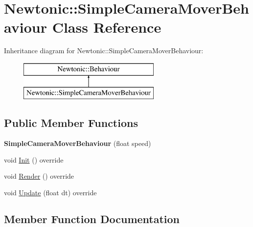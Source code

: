 \hypertarget{classNewtonic_1_1SimpleCameraMoverBehaviour}{}\section{Newtonic\+::Simple\+Camera\+Mover\+Behaviour Class Reference}
\label{classNewtonic_1_1SimpleCameraMoverBehaviour}
Inheritance diagram for Newtonic\+::Simple\+Camera\+Mover\+Behaviour\+:\begin{figure}[H]
\begin{center}
\leavevmode
\includegraphics[height=2.000000cm]{classNewtonic_1_1SimpleCameraMoverBehaviour}
\end{center}
\end{figure}
\subsection*{Public Member Functions}
\begin{DoxyCompactItemize}
\item 
\mbox{\label{classNewtonic_1_1SimpleCameraMoverBehaviour_ae82d69ee38d1ffa5f8dd0252be37f1ee}} 
{\bfseries Simple\+Camera\+Mover\+Behaviour} (float speed)
\item 
void \mbox{\hyperlink{classNewtonic_1_1SimpleCameraMoverBehaviour_ab119794df7ce0e548912caa100b7fcf5}{Init}} () override
\item 
void \mbox{\hyperlink{classNewtonic_1_1SimpleCameraMoverBehaviour_a52037ac47383855fa58f1fbebbb75e44}{Render}} () override
\item 
void \mbox{\hyperlink{classNewtonic_1_1SimpleCameraMoverBehaviour_ac2c1d4f6dc0ef16361605b0a8fd37be2}{Update}} (float dt) override
\end{DoxyCompactItemize}


\subsection{Member Function Documentation}
\mbox{\label{classNewtonic_1_1SimpleCameraMoverBehaviour_ab119794df7ce0e548912caa100b7fcf5}} 
